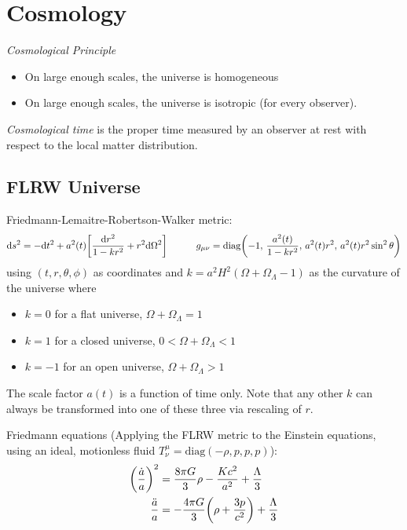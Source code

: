 \section{Cosmology}
	\emph{Cosmological Principle}
	\begin{itemize}
		\item On large enough scales, the universe is homogeneous
		\item On large enough scales, the universe is isotropic (for every observer).
	\end{itemize}

	\noindent
	\emph{Cosmological time} is the proper time measured by an observer at rest with respect to the local matter distribution.

	\subsection{FLRW Universe}
		Friedmann-Lemaitre-Robertson-Walker metric:
		\begin{equation}
			\dd s^2 = -\dd t^2 + a^2(t) \qty[\frac{\dd r^2}{1-kr^2} + r^2 \dd \Omega^2]
			\hspace{30pt}
			g_{\mu\nu} = \mathrm{diag}\qty(-1,\, \frac{a^2(t)}{1-kr^2},\, a^2(t) r^2,\, a^2(t) r^2 \sin^2 \theta)
		\end{equation}
		using $(t, r, \theta, \phi)$ as coordinates and $k = a^2 H^2 ( \Omega + \Omega_\Lambda - 1)$ as the curvature of the universe where
		\begin{itemize}
			\item $k=0$ for a flat universe, \ie $\Omega + \Omega_\Lambda = 1$
			\item $k=1$ for a closed universe, \ie $0 < \Omega + \Omega_\Lambda < 1$
			\item $k=-1$ for an open universe, \ie $\Omega + \Omega_\Lambda > 1$
		\end{itemize}
		The scale factor $a(t)$ is a function of time only. Note that any other $k$ can always be transformed into one of these three via rescaling of $r$.

		\noindent
		Friedmann equations (Applying the FLRW metric to the Einstein equations, using an ideal, motionless fluid $T^\mu_\nu = \text{diag}(-\rho, p, p, p)$):
		\begin{equation}
			\begin{aligned}
				\qty(\frac{\dot{a}}{a})^2 &= \frac{8 \pi G}{3} \rho - \frac{K c^2}{a^2} + \frac{\Lambda}{3} \\
				\frac{\ddot{a}}{a} &= -\frac{4 \pi G}{3} \qty(\rho + \frac{3p}{c^2}) + \frac{\Lambda}{3} \\
			\end{aligned}
		\end{equation}

